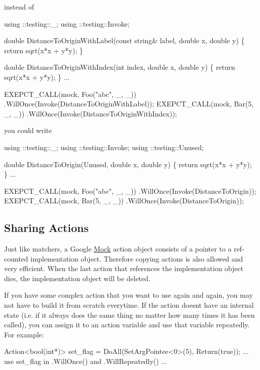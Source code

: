 instead of


\begin{DoxyCode}
using ::testing::\_;
using ::testing::Invoke;

double DistanceToOriginWithLabel(const string& label, double x, double y) \{
  return sqrt(x*x + y*y);
\}

double DistanceToOriginWithIndex(int index, double x, double y) \{
  return sqrt(x*x + y*y);
\}
...

  EXEPCT\_CALL(mock, Foo("abc", \_, \_))
      .WillOnce(Invoke(DistanceToOriginWithLabel));
  EXEPCT\_CALL(mock, Bar(5, \_, \_))
      .WillOnce(Invoke(DistanceToOriginWithIndex));
\end{DoxyCode}


you could write


\begin{DoxyCode}
using ::testing::\_;
using ::testing::Invoke;
using ::testing::Unused;

double DistanceToOrigin(Unused, double x, double y) \{
  return sqrt(x*x + y*y);
\}
...

  EXEPCT\_CALL(mock, Foo("abc", \_, \_))
      .WillOnce(Invoke(DistanceToOrigin));
  EXEPCT\_CALL(mock, Bar(5, \_, \_))
      .WillOnce(Invoke(DistanceToOrigin));
\end{DoxyCode}


\subsection*{Sharing Actions}

Just like matchers, a Google \hyperlink{class_mock}{Mock} action object consists of a pointer to a ref-\/counted implementation object. Therefore copying actions is also allowed and very efficient. When the last action that references the implementation object dies, the implementation object will be deleted.

If you have some complex action that you want to use again and again, you may not have to build it from scratch everytime. If the action doesn\textquotesingle{}t have an internal state (i.\+e. if it always does the same thing no matter how many times it has been called), you can assign it to an action variable and use that variable repeatedly. For example\+:


\begin{DoxyCode}
Action<bool(int*)> set\_flag = DoAll(SetArgPointee<0>(5),
                                    Return(true));
... use set\_flag in .WillOnce() and .WillRepeatedly() ...
\end{DoxyCode}


